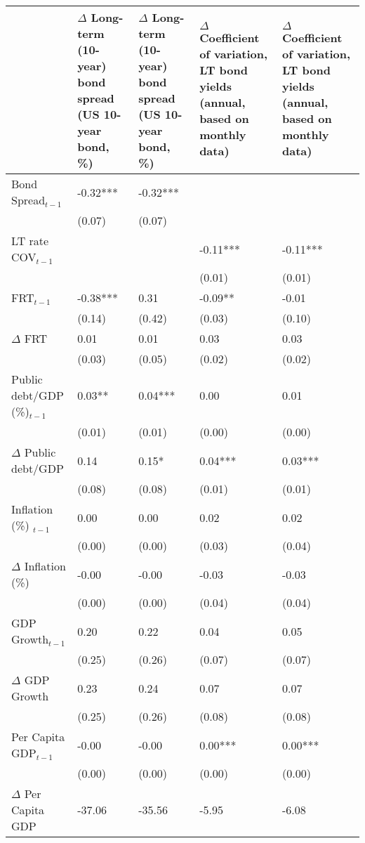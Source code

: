 \begingroup\tiny
\begin{tabular}{lp{3cm}p{3cm}p{3cm}p{3cm}}
  \hline
 & $\Delta$ Long-term (10-year) bond spread (US 10-year bond, \%) & $\Delta$ Long-term (10-year) bond spread (US 10-year bond, \%) & $\Delta$ Coefficient of variation, LT bond yields (annual, based on monthly data) & $\Delta$ Coefficient of variation, LT bond yields (annual, based on monthly data) \\ 
  \hline
Bond Spread$_{t-1}$ & -0.32*** & -0.32*** &  &  \\ 
   & (0.07) & (0.07) &  &  \\ 
  LT rate COV$_{t-1}$ &  &  & -0.11*** & -0.11*** \\ 
   &  &  & (0.01) & (0.01) \\ 
  FRT$_{t-1}$ & -0.38*** & 0.31 & -0.09** & -0.01 \\ 
   & (0.14) & (0.42) & (0.03) & (0.10) \\ 
  $\Delta$ FRT & 0.01 & 0.01 & 0.03 & 0.03 \\ 
   & (0.03) & (0.05) & (0.02) & (0.02) \\ 
  Public debt/GDP (\%)$_{t-1}$ & 0.03** & 0.04*** & 0.00 & 0.01 \\ 
   & (0.01) & (0.01) & (0.00) & (0.00) \\ 
  $\Delta$ Public debt/GDP & 0.14 & 0.15* & 0.04*** & 0.03*** \\ 
   & (0.08) & (0.08) & (0.01) & (0.01) \\ 
  Inflation (\%) $_{t-1}$ & 0.00 & 0.00 & 0.02 & 0.02 \\ 
   & (0.00) & (0.00) & (0.03) & (0.04) \\ 
  $\Delta$ Inflation (\%) & -0.00 & -0.00 & -0.03 & -0.03 \\ 
   & (0.00) & (0.00) & (0.04) & (0.04) \\ 
  GDP Growth$_{t-1}$ & 0.20 & 0.22 & 0.04 & 0.05 \\ 
   & (0.25) & (0.26) & (0.07) & (0.07) \\ 
  $\Delta$ GDP Growth & 0.23 & 0.24 & 0.07 & 0.07 \\ 
   & (0.25) & (0.26) & (0.08) & (0.08) \\ 
  Per Capita GDP$_{t-1}$ & -0.00 & -0.00 & 0.00*** & 0.00*** \\ 
   & (0.00) & (0.00) & (0.00) & (0.00) \\ 
  $\Delta$ Per Capita GDP & -37.06 & -35.56 & -5.95 & -6.08 \\ 

\end{tabular}
